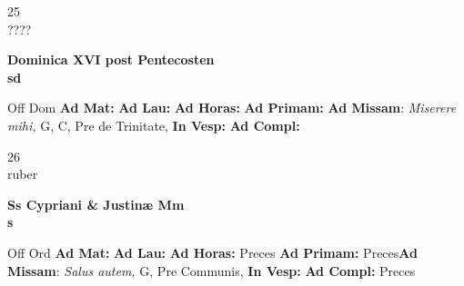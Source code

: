 \documentclass[10pt, openany]{book}
\begin{document}
    \begin{center}
        \begin{minipage}{3.5in}
            \vspace{2em}
            \begin{minipage}{0.5in}
                {\Huge 25} \\
                {\normalsize ????}
            \end{minipage}
            \begin{minipage}{3.0in}
                \textbf{ \large Dominica XVI post Pentecosten \\
                \textnormal{\normalsize sd}}

            \end{minipage}
            \begin{justify}Off Dom
                \textbf{Ad Mat: }
                \textbf{Ad Lau: }
                \textbf{Ad Horas: }
                \textbf{Ad Primam: }\textbf{Ad Missam}: \textit{Miserere mihi,} G, C, Pre de Trinitate, 
                \textbf{In Vesp: }
                \textbf{Ad Compl: }
            \end{justify}
        \end{minipage}
    \end{center}

    \begin{center}
        \begin{minipage}{3.5in}
            \vspace{2em}
            \begin{minipage}{0.5in}
                {\Huge 26} \\
                {\normalsize ruber}
            \end{minipage}
            \begin{minipage}{3.0in}
                \textbf{ \large Ss Cypriani \& Justinæ Mm \\
                \textnormal{\normalsize s}}

            \end{minipage}
            \begin{justify}Off Ord
                \textbf{Ad Mat: }
                \textbf{Ad Lau: }
                \textbf{Ad Horas: }Preces
                \textbf{Ad Primam: }Preces\textbf{Ad Missam}: \textit{Salus autem,} G, Pre Communis, 
                \textbf{In Vesp: }
                \textbf{Ad Compl: }Preces
            \end{justify}
        \end{minipage}
    \end{center}
\end{document}
